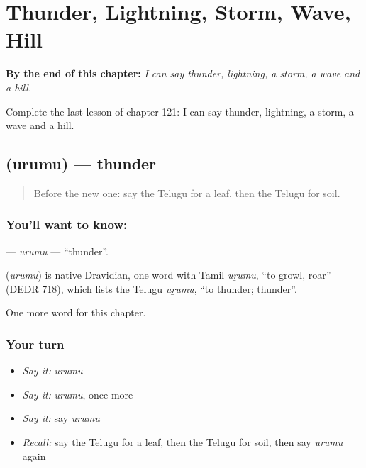 
\chapter{Thunder, Lightning, Storm, Wave, Hill}
\label{ch:te-thunder-lightning-storm-wave-hill}

\begin{chapteropening}
\textbf{By the end of this chapter:} \emph{I can say thunder, lightning, a storm, a wave and a hill.}

Complete the last lesson of chapter 121: I can say thunder, lightning, a storm, a wave and a hill.
\end{chapteropening}

\section[\texorpdfstring{\te{ఉరుము} (urumu)}{ఉరుము (urumu)}]{ (urumu) — thunder}

\label{lesson:TE-C121-urumu}



\begin{quote}
Before the new one: say the Telugu for a leaf, then the Telugu for soil.
\end{quote}

\subsection*{You'll want to know: }
\textbf{} — \emph{urumu} — \textquotedblleft{}thunder\textquotedblright{}.

\begin{cousinweb}
\textbf{} (\emph{urumu}) is native Dravidian, one word with Tamil \emph{uṟumu}, \textquotedblleft{}to growl, roar\textquotedblright{} (DEDR 718), which lists the Telugu \emph{uṟumu}, \textquotedblleft{}to thunder; thunder\textquotedblright{}.
\end{cousinweb}

\begin{grammarlens}[title={What you've built}]
One more word for this chapter.
\end{grammarlens}

\subsection*{Your turn}
\begin{itemize}
\raggedright
  \item \emph{Say it:} \emph{urumu}
  \item \emph{Say it:} \emph{urumu}, once more
  \item \emph{Say it:} say \emph{urumu}
  \item \emph{Recall:} say the Telugu for a leaf, then the Telugu for soil, then say \emph{urumu} again
\end{itemize}

